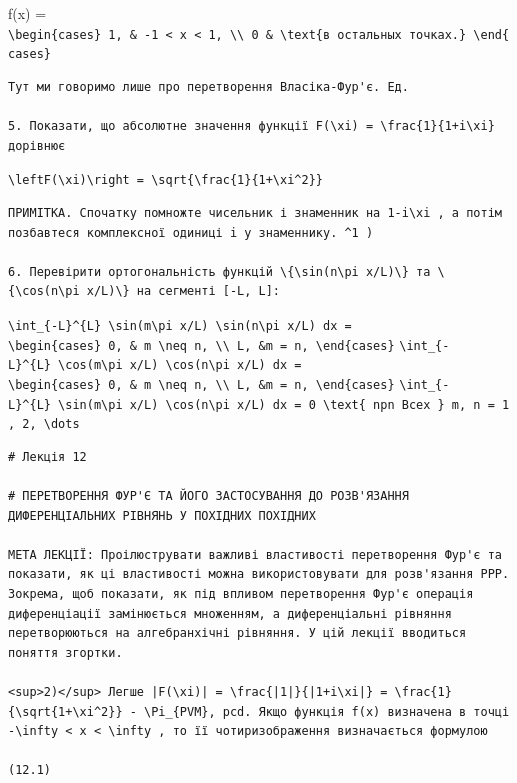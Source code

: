 \documentclass[
  ukrainian,
]{article}
\begin{document}
f(x) =
\texttt{\textbackslash{}begin\{cases\}\ 1,\ \&\ -1\ \textless{}\ x\ \textless{}\ 1,\ \textbackslash{}\textbackslash{}\ 0\ \&\ \textbackslash{}text\{в\ остальных\ точках.\}\ \textbackslash{}end\{cases\}}

\begin{verbatim}
Тут ми говоримо лише про перетворення Власіка-Фур'є. Ед.

5. Показати, що абсолютне значення функції F(\xi) = \frac{1}{1+i\xi} дорівнює
\end{verbatim}

\texttt{\textbackslash{}left\textbar{}F(\textbackslash{}xi)\textbackslash{}right\textbar{}\ =\ \textbackslash{}sqrt\{\textbackslash{}frac\{1\}\{1+\textbackslash{}xi\^{}2\}\}}

\begin{verbatim}
ПРИМІТКА. Спочатку помножте чисельник і знаменник на 1-i\xi , а потім позбавтеся комплексної одиниці i у знаменнику. ^1 )

6. Перевірити ортогональність функцій \{\sin(n\pi x/L)\} та \{\cos(n\pi x/L)\} на сегменті [-L, L]:
\end{verbatim}

\texttt{\textbackslash{}int\_\{-L\}\^{}\{L\}\ \textbackslash{}sin(m\textbackslash{}pi\ x/L)\ \textbackslash{}sin(n\textbackslash{}pi\ x/L)\ dx\ =}
\texttt{\textbackslash{}begin\{cases\}\ 0,\ \&\ m\ \textbackslash{}neq\ n,\ \textbackslash{}\textbackslash{}\ L,\ \&m\ =\ n,\ \textbackslash{}end\{cases\}}
\texttt{\textbackslash{}int\_\{-L\}\^{}\{L\}\ \textbackslash{}cos(m\textbackslash{}pi\ x/L)\ \textbackslash{}cos(n\textbackslash{}pi\ x/L)\ dx\ =}
\texttt{\textbackslash{}begin\{cases\}\ 0,\ \&\ m\ \textbackslash{}neq\ n,\ \textbackslash{}\textbackslash{}\ L,\ \&m\ =\ n,\ \textbackslash{}end\{cases\}}
\texttt{\textbackslash{}int\_\{-L\}\^{}\{L\}\ \textbackslash{}sin(m\textbackslash{}pi\ x/L)\ \textbackslash{}cos(n\textbackslash{}pi\ x/L)\ dx\ =\ 0\ \textbackslash{}text\{\ npn\ Bcex\ \}\ m,\ n\ =\ 1,\ 2,\ \textbackslash{}dots}

\begin{verbatim}
# Лекція 12

# ПЕРЕТВОРЕННЯ ФУР'Є ТА ЙОГО ЗАСТОСУВАННЯ ДО РОЗВ'ЯЗАННЯ ДИФЕРЕНЦІАЛЬНИХ РІВНЯНЬ У ПОХІДНИХ ПОХІДНИХ

МЕТА ЛЕКЦІЇ: Проілюструвати важливі властивості перетворення Фур'є та показати, як ці властивості можна використовувати для розв'язання PPP. Зокрема, щоб показати, як під впливом перетворення Фур'є операція диференціації замінюється множенням, а диференціальні рівняння перетворюються на алгебранхічні рівняння. У цій лекції вводиться поняття згортки.

<sup>2)</sup> Легше |F(\xi)| = \frac{|1|}{|1+i\xi|} = \frac{1}{\sqrt{1+\xi^2}} - \Pi_{PVM}, pcd. Якщо функція f(x) визначена в точці -\infty < x < \infty , то її чотиризображення визначається формулою

(12.1)
\end{verbatim}
\end{document}
